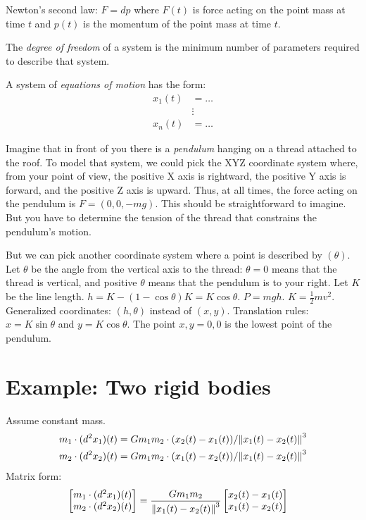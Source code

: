 Newton's second law:
\(F = dp\) where \(F(t)\) is force acting on the point mass at time \(t\)
and \(p(t)\) is the momentum of the point mass at time \(t\).

The \emph{degree of freedom} of a system is the minimum number of parameters required to describe that system.

A system of \emph{equations of motion} has the form:
\begin{align*}
    x_1(t) &= \ldots
    \\
    & \vdots
    \\
    x_n(t) &= \ldots
\end{align*}

Imagine that in front of you there is a \emph{pendulum} hanging on a thread attached to the roof.
To model that system, we could pick the XYZ coordinate system
where, from your point of view,
the positive X axis is rightward, the positive Y axis is forward, and the positive Z axis is upward.
Thus, at all times, the force acting on the pendulum is \( F = (0,0,-mg) \).
This should be straightforward to imagine.
But you have to determine the tension of the thread that constrains the pendulum's motion.

But we can pick another coordinate system where a point is described by \( (\theta) \).
Let \(\theta\) be the angle from the vertical axis to the thread:
\( \theta = 0 \) means that the thread is vertical,
and positive \( \theta \) means that the pendulum is to your right.
Let \( K \) be the line length.
\(h = K - (1 - \cos \theta) K = K \cos \theta\).
\(P = m g h\).
\(K = \frac{1}{2} m v^2\).
Generalized coordinates: \((h,\theta)\) instead of \((x,y)\).
Translation rules: \(x = K \sin \theta\) and \(y = K \cos \theta\).
The point \(x,y=0,0\) is the lowest point of the pendulum.

\section{Example: Two rigid bodies}

Assume constant mass.
\begin{align*}
    m_1 \cdot (d^2 x_1)(t) &= G m_1 m_2 \cdot (x_2(t) - x_1(t)) / \norm{x_1(t) - x_2(t)}^3
    \\
    m_2 \cdot (d^2 x_2)(t) &= G m_1 m_2 \cdot (x_1(t) - x_2(t)) / \norm{x_1(t) - x_2(t)}^3
\end{align*}
Matrix form:
\begin{align*}
    \begin{bmatrix}
        m_1 \cdot (d^2 x_1)(t)
        \\
        m_2 \cdot (d^2 x_2)(t)
    \end{bmatrix}
    &=
    \frac{G m_1 m_2}{\norm{x_1(t) - x_2(t)}^3}
    \begin{bmatrix}
        x_2(t) - x_1(t)
        \\
        x_1(t) - x_2(t)
    \end{bmatrix}
\end{align*}

